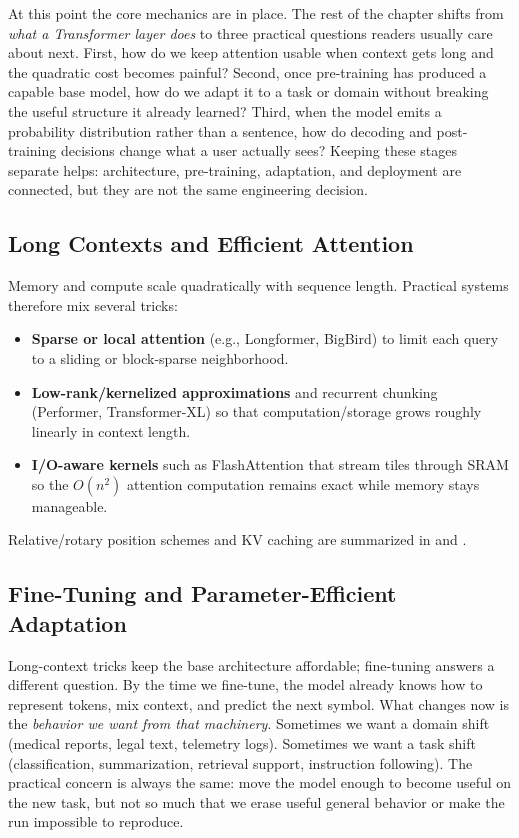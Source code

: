 At this point the core mechanics are in place. The rest of the chapter shifts from \emph{what a Transformer layer does} to three practical questions readers usually care about next. First, how do we keep attention usable when context gets long and the quadratic cost becomes painful? Second, once pre-training has produced a capable base model, how do we adapt it to a task or domain without breaking the useful structure it already learned? Third, when the model emits a probability distribution rather than a sentence, how do decoding and post-training decisions change what a user actually sees? Keeping these stages separate helps: architecture, pre-training, adaptation, and deployment are connected, but they are not the same engineering decision.

\subsection{Long Contexts and Efficient Attention}
\label{sec:transformers_long_contexts_and_efficient_attention}
Memory and compute scale quadratically with sequence length. Practical systems therefore mix several tricks:
\begin{itemize}
    \item \textbf{Sparse or local attention} (e.g., Longformer, BigBird) to limit each query to a sliding or block-sparse neighborhood.
    \item \textbf{Low-rank/kernelized approximations} and recurrent chunking (Performer, Transformer-XL) so that computation/storage grows roughly linearly in context length.
    \item \textbf{I/O-aware kernels} such as FlashAttention that stream tiles through SRAM so the \(O(n^2)\) attention computation remains exact while memory stays manageable.
\end{itemize}
Relative/rotary position schemes and KV caching are summarized in  and .

\subsection{Fine-Tuning and Parameter-Efficient Adaptation}
\label{sec:transformers_fine_tuning_and_parameter_efficient_adaptation}
Long-context tricks keep the base architecture affordable; fine-tuning answers a different question. By the time we fine-tune, the model already knows how to represent tokens, mix context, and predict the next symbol. What changes now is the \emph{behavior we want from that machinery}. Sometimes we want a domain shift (medical reports, legal text, telemetry logs). Sometimes we want a task shift (classification, summarization, retrieval support, instruction following). The practical concern is always the same: move the model enough to become useful on the new task, but not so much that we erase useful general behavior or make the run impossible to reproduce.

